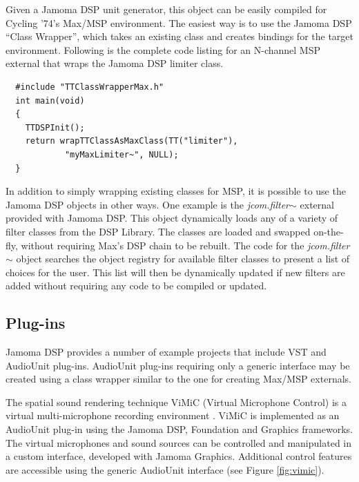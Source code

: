 \documentclass[twoside,10pt]{article}
\begin{document}
Given a Jamoma DSP unit generator, this object can be easily compiled for Cycling '74's Max/MSP environment.  The easiest way is to use the Jamoma DSP ``Class Wrapper'', which takes an existing class and creates bindings for the target environment. Following is the complete code listing for an N-channel MSP external that wraps the Jamoma DSP limiter class.

\begin{lstlisting}
  #include "TTClassWrapperMax.h"
  int main(void)
  {
    TTDSPInit();
    return wrapTTClassAsMaxClass(TT("limiter"), 
            "myMaxLimiter~", NULL);
  }
\end{lstlisting}

\noindent In addition to simply wrapping existing classes for MSP, it is possible to use the Jamoma DSP objects in other ways.  One example is the \emph{\small{jcom.filter$\sim$}} external provided with Jamoma DSP.  
This object dynamically loads any of a variety of filter classes from the DSP Library.  The classes are loaded and swapped on-the-fly, without requiring Max's DSP chain to be rebuilt.  The code for the \emph{\small{jcom.filter$\sim$}} object searches the object registry for available filter classes to present a list of choices for the user.  This list will then be dynamically updated if new filters are added without requiring any code to be compiled or updated.   


\subsection{Plug-ins}

Jamoma DSP provides a number of example projects that include VST and AudioUnit plug-ins.  AudioUnit plug-ins requiring only a generic interface may be created using a class wrapper similar to the one for creating Max/MSP externals.  

The spatial sound rendering technique ViMiC (Virtual Microphone Control) is a virtual multi-microphone recording environment \cite{CMJ08-VIMIC}.  ViMiC is implemented as an AudioUnit plug-in using the Jamoma DSP, Foundation and Graphics frameworks.  The virtual microphones and sound sources can be controlled and manipulated in a custom interface, developed with Jamoma Graphics.  Additional control features are accessible using the generic AudioUnit interface (see Figure \ref{fig:vimic}).
\end{document}
